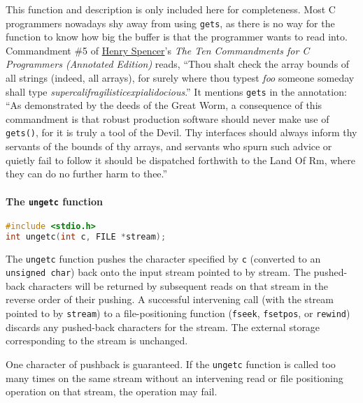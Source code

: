 This function and description is only included here for completeness. Most C
programmers nowadays shy away from using \texttt{gets}, as there is no way for
the function to know how big the buffer is that the programmer wants to read
into. Commandment \#5 of
\href{http://en.wikipedia.org/wiki/Henry_Spencer}{Henry Spencer}'s \emph{The
Ten Commandments for C Programmers (Annotated Edition)} reads, ``Thou shalt
check the array bounds of all strings (indeed, all arrays), for surely where
thou typest \emph{foo} someone someday shall type
\emph{supercalifragilisticexpialidocious}.'' It mentions \texttt{gets} in the
annotation: ``As demonstrated by the deeds of the Great Worm, a consequence of
this commandment is that robust production software should never make use of
\texttt{gets()}, for it is truly a tool of the Devil. Thy interfaces should
always inform thy servants of the bounds of thy arrays, and servants who spurn
such advice or quietly fail to follow it should be dispatched forthwith to the
Land Of Rm, where they can do no further harm to thee.''

\paragraph{The \texttt{ungetc} function}
\lstset{basicstyle=\scriptsize, numbers=left, captionpos=b, tabsize=4}
\begin{lstlisting}[caption=Section \thesection listing \arabic{filecnt},language={C},
breaklines=true,xleftmargin=15pt,label=lst:section\thesection listing\arabic{filecnt}]
#include <stdio.h>
int ungetc(int c, FILE *stream);
\end{lstlisting}

The \texttt{ungetc} function pushes the character specified by \texttt{c}
(converted to an \texttt{unsigned char}) back onto the input stream pointed to
by stream. The pushed-back characters will be returned by subsequent reads on
that stream in the reverse order of their pushing. A successful intervening
call (with the stream pointed to by \texttt{stream}) to a file-positioning
function (\texttt{fseek}, \texttt{fsetpos}, or \texttt{rewind}) discards any
pushed-back characters for the stream. The external storage corresponding to
the stream is unchanged.

One character of pushback is guaranteed. If the \texttt{ungetc} function is
called too many times on the same stream without an intervening read or file
positioning operation on that stream, the operation may fail.

